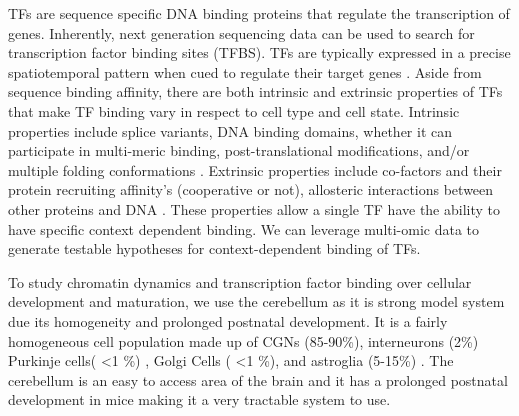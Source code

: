 \documentclass[fleqn,10pt]{wlscirep}
\begin{document}
TFs are sequence specific DNA binding proteins that regulate the transcription of genes. Inherently, next generation sequencing data can be used to search for transcription factor binding sites (TFBS).  TFs are typically expressed in a precise spatiotemporal pattern when cued to regulate their target genes \cite{}. Aside from sequence binding affinity, there are both intrinsic and extrinsic properties of TFs that make TF binding vary in respect to cell type and cell state.  Intrinsic properties include splice variants, DNA binding domains, whether it can participate in multi-meric binding, post-translational modifications, and/or multiple folding conformations \cite{Siggers2014Protein-DNACodes, Slattery2014AbsenceGenome}. Extrinsic properties include co-factors and their protein recruiting affinity's (cooperative or not), allosteric interactions between other proteins and DNA \cite{Siggers2014Protein-DNACodes}. These properties allow a single TF have the ability to have specific context dependent binding. We can leverage multi-omic data to generate testable hypotheses for context-dependent binding of TFs.
 
To study chromatin dynamics and transcription factor binding over cellular development and maturation, we use the cerebellum as it is strong model system due its homogeneity and prolonged postnatal development.  It is a fairly homogeneous cell population made up of CGNs (85-90\%), interneurons (2\%) Purkinje cells( \textless 1 \%) , Golgi Cells ( \textless 1 \%), and astroglia (5-15\%) \cite{Frank2015RegulationCerebellum}. The cerebellum is an easy to access area of the brain and it has a prolonged postnatal development in mice making it a very tractable system to use\cite{Wang2001GeneticDevelopment}. 
\end{document}

